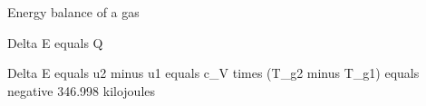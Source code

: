 Energy balance of a gas  

Delta E equals Q  

Delta E equals u2 minus u1 equals c_V times (T_g2 minus T_g1) equals negative 346.998 kilojoules